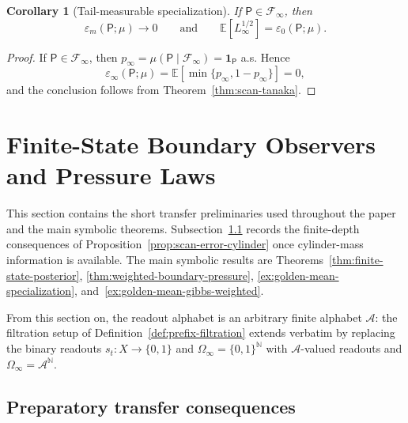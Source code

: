\documentclass{etds}%
\numberwithin{equation}{section}
\theoremstyle{plain}
\newtheorem{corollary}[theorem]{Corollary}
\theoremstyle{definition}
\theoremstyle{remark}
\newcommand{\EE}{\mathbb{E}}
\newcommand{\NN}{\mathbb{N}}
\newcommand{\ind}{\mathbf{1}}
\begin{document}
\begin{corollary}[Tail-measurable specialization]
\label{cor:scan-tanaka-tail}
If $\mathsf{P}\in\mathcal{F}_\infty$, then
\[
\varepsilon_m(\mathsf{P};\mu)\to 0
\qquad\text{and}\qquad
\EE[L_\infty^{1/2}]=\varepsilon_0(\mathsf{P};\mu).
\]
\end{corollary}

\begin{proof}
If $\mathsf{P}\in\mathcal{F}_\infty$, then
$p_\infty=\mu(\mathsf{P}\mid\mathcal{F}_\infty)=\ind_{\mathsf{P}}$ a.s.  Hence
\[
\varepsilon_\infty(\mathsf{P};\mu)
=\EE[\min\{p_\infty,1-p_\infty\}]=0,
\]
and the conclusion follows from Theorem~\ref{thm:scan-tanaka}.
\end{proof}

\section{Finite-State Boundary Observers and Pressure Laws}
\label{sec:rates}

This section contains the short transfer preliminaries used throughout the
paper and the main symbolic theorems.  Subsection~\ref{sub:boundary-growth}
records the finite-depth consequences of
Proposition~\ref{prop:scan-error-cylinder} once cylinder-mass information is
available.  The main symbolic results are
Theorems~\ref{thm:finite-state-posterior},
\ref{thm:weighted-boundary-pressure}, \ref{ex:golden-mean-specialization},
and~\ref{ex:golden-mean-gibbs-weighted}.

From this section on, the readout alphabet is an arbitrary finite alphabet
$\mathcal{A}$: the filtration setup of Definition~\ref{def:prefix-filtration}
extends verbatim by replacing the binary readouts
$s_t:X\to\{0,1\}$ and $\Omega_\infty=\{0,1\}^{\NN}$ with
$\mathcal{A}$-valued readouts and $\Omega_\infty=\mathcal{A}^{\NN}$.

\subsection{Preparatory transfer consequences}
\label{sub:boundary-growth}
\end{document}
